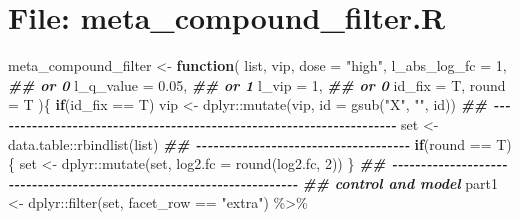 \documentclass[
]{article}
\newenvironment{Shaded}{\begin{snugshade}}{\end{snugshade}}
\newcommand{\AttributeTok}[1]{\textcolor[rgb]{0.77,0.63,0.00}{#1}}
\newcommand{\ControlFlowTok}[1]{\textcolor[rgb]{0.13,0.29,0.53}{\textbf{#1}}}
\newcommand{\DecValTok}[1]{\textcolor[rgb]{0.00,0.00,0.81}{#1}}
\newcommand{\DocumentationTok}[1]{\textcolor[rgb]{0.56,0.35,0.01}{\textbf{\textit{#1}}}}
\newcommand{\FloatTok}[1]{\textcolor[rgb]{0.00,0.00,0.81}{#1}}
\newcommand{\FunctionTok}[1]{\textcolor[rgb]{0.00,0.00,0.00}{#1}}
\newcommand{\NormalTok}[1]{#1}
\newcommand{\OtherTok}[1]{\textcolor[rgb]{0.56,0.35,0.01}{#1}}
\newcommand{\SpecialCharTok}[1]{\textcolor[rgb]{0.00,0.00,0.00}{#1}}
\newcommand{\StringTok}[1]{\textcolor[rgb]{0.31,0.60,0.02}{#1}}
\begin{document}
\hypertarget{file-meta_compound_filter.r}{%
\section{File: meta\_compound\_filter.R}\label{file-meta_compound_filter.r}}

\begin{Shaded}
\begin{Highlighting}[]
\NormalTok{meta\_compound\_filter }\OtherTok{\textless{}{-}} 
  \ControlFlowTok{function}\NormalTok{(}
\NormalTok{           list,}
\NormalTok{           vip,}
           \AttributeTok{dose =} \StringTok{"high"}\NormalTok{,}
           \AttributeTok{l\_abs\_log\_fc =} \DecValTok{1}\NormalTok{, }\DocumentationTok{\#\# or 0}
           \AttributeTok{l\_q\_value =} \FloatTok{0.05}\NormalTok{, }\DocumentationTok{\#\# or 1}
           \AttributeTok{l\_vip =} \DecValTok{1}\NormalTok{, }\DocumentationTok{\#\# or 0}
           \AttributeTok{id\_fix =}\NormalTok{ T,}
           \AttributeTok{round =}\NormalTok{ T}
\NormalTok{           )\{}
    \ControlFlowTok{if}\NormalTok{(id\_fix }\SpecialCharTok{==}\NormalTok{ T)}
\NormalTok{      vip }\OtherTok{\textless{}{-}}\NormalTok{ dplyr}\SpecialCharTok{::}\FunctionTok{mutate}\NormalTok{(vip, }\AttributeTok{id =} \FunctionTok{gsub}\NormalTok{(}\StringTok{"X"}\NormalTok{, }\StringTok{""}\NormalTok{, id))}
    \DocumentationTok{\#\# {-}{-}{-}{-}{-}{-}{-}{-}{-}{-}{-}{-}{-}{-}{-}{-}{-}{-}{-}{-}{-}{-}{-}{-}{-}{-}{-}{-}{-}{-}{-}{-}{-}{-}{-}{-}{-}{-}{-}{-}{-}{-}{-}{-}{-}{-}{-}{-}{-}{-}{-}{-}{-}{-}{-}{-}{-}{-}{-}{-}{-}{-}{-}{-}{-}{-}{-}{-}{-}{-} }
\NormalTok{    set }\OtherTok{\textless{}{-}}\NormalTok{ data.table}\SpecialCharTok{::}\FunctionTok{rbindlist}\NormalTok{(list)}
    \DocumentationTok{\#\# {-}{-}{-}{-}{-}{-}{-}{-}{-}{-}{-}{-}{-}{-}{-}{-}{-}{-}{-}{-}{-}{-}{-}{-}{-}{-}{-}{-}{-}{-}{-}{-}{-}{-}{-}{-}{-} }
    \ControlFlowTok{if}\NormalTok{(round }\SpecialCharTok{==}\NormalTok{ T)\{}
\NormalTok{      set }\OtherTok{\textless{}{-}}\NormalTok{ dplyr}\SpecialCharTok{::}\FunctionTok{mutate}\NormalTok{(set, }\AttributeTok{log2.fc =} \FunctionTok{round}\NormalTok{(log2.fc, }\DecValTok{2}\NormalTok{))}
\NormalTok{    \}}
    \DocumentationTok{\#\# {-}{-}{-}{-}{-}{-}{-}{-}{-}{-}{-}{-}{-}{-}{-}{-}{-}{-}{-}{-}{-}{-}{-}{-}{-}{-}{-}{-}{-}{-}{-}{-}{-}{-}{-}{-}{-}{-}{-}{-}{-}{-}{-}{-}{-}{-}{-}{-}{-}{-}{-}{-}{-}{-}{-}{-}{-}{-}{-}{-}{-}{-}{-}{-}{-}{-}{-}{-}{-}{-} }
    \DocumentationTok{\#\# control and model}
\NormalTok{    part1 }\OtherTok{\textless{}{-}}\NormalTok{ dplyr}\SpecialCharTok{::}\FunctionTok{filter}\NormalTok{(set, facet\_row }\SpecialCharTok{==} \StringTok{"extra"}\NormalTok{) }\SpecialCharTok{\%\textgreater{}\%}

\end{Highlighting}
\end{Shaded}
\end{document}
